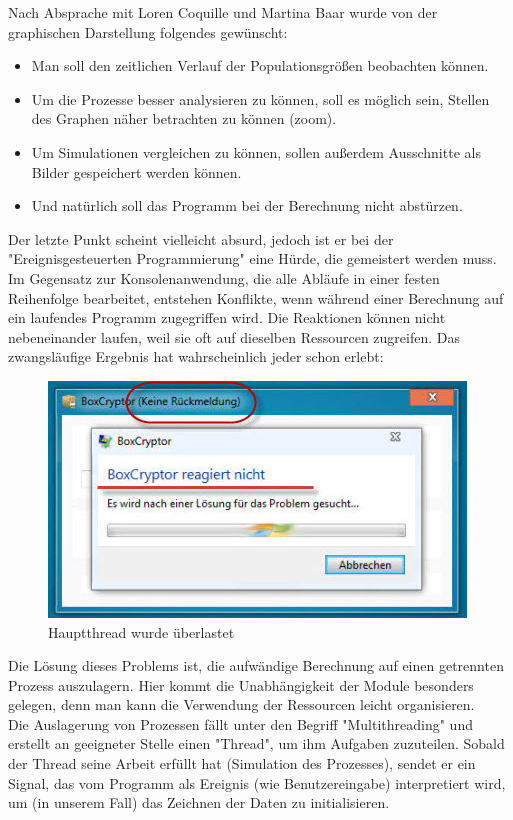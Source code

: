 \documentclass[11pt, a4paper, german]{article}
\theoremstyle{plain}
\begin{document}
	Nach Absprache mit Loren Coquille und Martina Baar wurde von der graphischen Darstellung folgendes gewünscht:\\
	\begin{itemize}
		\item Man soll den zeitlichen Verlauf der Populationsgrößen beobachten \- können.
		\item Um die Prozesse besser analysieren zu können, soll es möglich sein, Stellen des Graphen näher betrachten zu können (zoom).
		\item Um Simulationen vergleichen zu können, sollen außerdem Ausschnitte als Bilder gespeichert werden können.
		\item Und natürlich soll das Programm bei der Berechnung nicht abstürzen.
	\end{itemize}
	Der letzte Punkt scheint vielleicht absurd, jedoch ist er bei der "{}Ereignisgesteuerten Programmierung"{} eine Hürde, die gemeistert werden muss.\\
	Im Gegensatz zur Konsolenanwendung, die alle Abläufe in einer festen Reihenfolge bearbeitet, entstehen Konflikte, wenn während einer Berechnung auf ein laufendes Programm zugegriffen wird. Die Reaktionen können nicht nebeneinander laufen, weil sie oft auf dieselben Ressourcen zugreifen. Das zwangsläufige Ergebnis hat wahrscheinlich jeder schon erlebt:
	\begin{figure}[H]
		\centering
		\includegraphics[width=0.7\linewidth]{./Pictures/KeineRueckmeldung}
		\caption[Keine Rueckmeldung]{Hauptthread wurde überlastet}
		\label{Keine Rueckmeldung}
	\end{figure}
	Die Lösung dieses Problems ist, die aufwändige Berechnung auf einen getrennten Prozess auszulagern. Hier kommt die Unabhängigkeit der Module besonders gelegen, denn man kann die Verwendung der Ressourcen leicht organisieren.\\
	Die Auslagerung von Prozessen fällt unter den Begriff "{}Multithreading"{} und erstellt an geeigneter Stelle einen "{}Thread"{}, um ihm Aufgaben zuzuteilen. Sobald der Thread seine Arbeit erfüllt hat (Simulation des Prozesses), sendet er ein Signal, das vom Programm als Ereignis (wie Benutzereingabe) interpretiert wird, um (in unserem Fall) das Zeichnen der Daten zu initialisieren.\\
\end{document}
